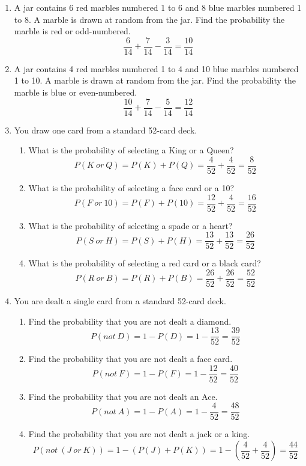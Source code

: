 \begin{enumerate}
\item A jar contains 6 red marbles numbered 1 to 6 and 8 blue marbles numbered 1 to 8. A marble is drawn at random from the jar. Find the probability the marble is red or odd-numbered. 
\[\dfrac{6}{14} + \dfrac{7}{14} - \dfrac{3}{14} = \dfrac{10}{14}\]

\item A jar contains 4 red marbles numbered 1 to 4 and 10 blue marbles numbered 1 to 10. A marble is drawn at random from the jar. Find the probability the marble is blue or even-numbered. 
\[\dfrac{10}{14} + \dfrac{7}{14} - \dfrac{5}{14} = \dfrac{12}{14}\]

\item You draw one card from a standard 52-card deck. 
\begin{enumerate}
\item What is the probability of selecting a King or a Queen? 
\[P(K\ or\ Q) = P(K) + P(Q) = \dfrac{4}{52} + \dfrac{4}{52} = \dfrac{8}{52}\]
\item What is the probability of selecting a face card or a 10? 
\[P(F\ or\ 10) = P(F) + P(10) = \dfrac{12}{52} + \dfrac{4}{52} = \dfrac{16}{52}\]
\item What is the probability of selecting a spade or a heart? 
\[P(S\ or\ H) = P(S) + P(H) = \dfrac{13}{52} + \dfrac{13}{52} = \dfrac{26}{52}\]
\item What is the probability of selecting a red card or a black card? 
\[P(R\ or\ B) = P(R) + P(B) = \dfrac{26}{52} + \dfrac{26}{52} = \dfrac{52}{52}\]
\end{enumerate}

\item You are dealt a single card from a standard 52-card deck.
\begin{enumerate}
\item Find the probability that you are not dealt a diamond. 
\[P(not\ D) = 1 - P(D) = 1 - \dfrac{13}{52} = \dfrac{39}{52}\]
\item Find the probability that you are not dealt a face card. 
\[P(not\ F) = 1 - P(F) = 1 - \dfrac{12}{52} = \dfrac{40}{52}\]
\item Find the probability that you are not dealt an Ace. 
\[P(not\ A) = 1 - P(A) = 1 - \dfrac{4}{52} = \dfrac{48}{52}\]
\item Find the probability that you are not dealt a jack or a king. 
\[P(not\ (J\ or\ K)) = 1 - (P(J) + P(K)) = 1 - \left(\dfrac{4}{52} + \dfrac{4}{52}\right) = \dfrac{44}{52}\]
\end{enumerate}


\end{enumerate}
